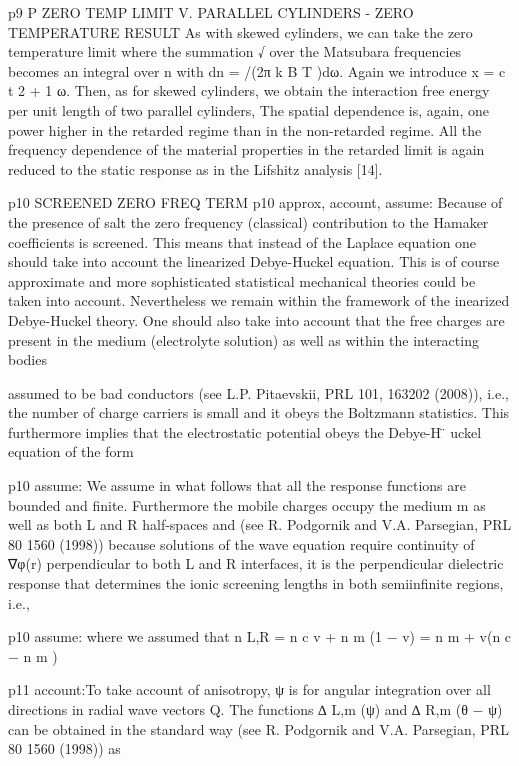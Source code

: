 p9 P ZERO TEMP LIMIT
V.
PARALLEL CYLINDERS - ZERO TEMPERATURE RESULT
As with skewed cylinders, we can take the zero temperature limit where the summation
√ over the Matsubara
frequencies becomes an integral over n with dn = /(2π k B T )dω. Again we introduce x = c t 2 + 1 ω. Then, as for
skewed cylinders, we obtain the interaction free energy per unit length of two parallel cylinders,
The spatial dependence is, again, one power higher in the retarded regime than in the non-retarded regime. All the
frequency dependence of the material properties in the retarded limit is again reduced to the static response as in the
Lifshitz analysis [14].

p10 SCREENED ZERO FREQ TERM
p10 approx, account, assume: 
Because of the presence of salt the zero frequency (classical) contribution to the Hamaker coefficients is screened.
This means that instead of the Laplace equation one should take into 
account the linearized Debye-Huckel equation.
This is of course 
approximate and more sophisticated statistical mechanical theories could be taken into account.
Nevertheless we remain within the framework of the inearized Debye-Huckel theory. One should also take into
account that the free charges are present in the medium (electrolyte solution) as well as within the interacting bodies

assumed to be bad conductors (see L.P. Pitaevskii, PRL 101, 163202 (2008)), i.e., the number of charge carriers
is small and it obeys the Boltzmann statistics. This furthermore implies that the electrostatic potential obeys the
Debye-H ̈
uckel equation of the form

p10 assume:
We
assume in what follows that all the response functions are bounded and finite. Furthermore the mobile charges occupy
the medium m as well as both L and R half-spaces and (see R. Podgornik and V.A. Parsegian, PRL 80 1560 (1998))
because solutions of the wave equation require continuity of ∇φ(r) perpendicular to both L and R interfaces, it is
the perpendicular dielectric response that determines the ionic screening lengths in both semiinfinite regions, i.e.,

p10 assume:
where we assumed that
n L,R = n c v + n m (1 − v) = n m + v(n c − n m )

p11 
account:To take account of anisotropy, ψ is for angular integration
over all directions in radial wave vectors Q. The functions ∆ L,m (ψ) and ∆ R,m (θ − ψ) can be obtained in the standard
way (see R. Podgornik and V.A. Parsegian, PRL 80 1560 (1998)) as

